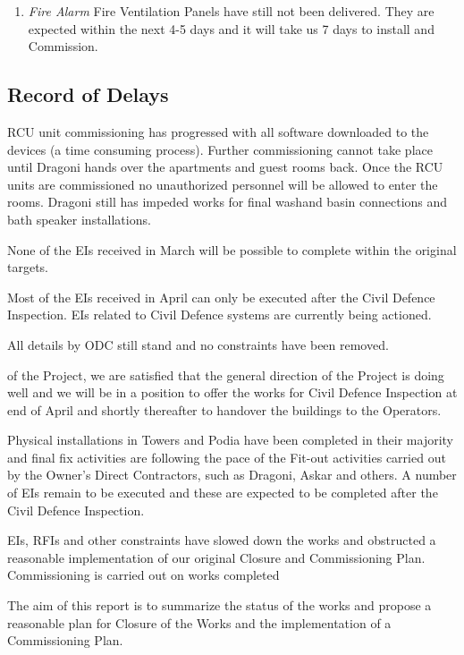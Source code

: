 \begin{update}
\begin{enumerate}
\item \textit{Fire Alarm} Fire Ventilation Panels have still not been delivered. They are expected within
the next 4-5 days and it will take us 7 days to install and Commission.
\end{enumerate}



\subsection*{Record of Delays}
RCU unit commissioning has progressed with all software downloaded to the devices (a time consuming process). Further commissioning cannot take place until Dragoni hands over the apartments and guest rooms back. Once the RCU units are commissioned no unauthorized personnel will be allowed to enter the rooms. Dragoni still has impeded works for final washand basin connections and bath speaker installations.

None of the EIs received in March will be possible to complete within the original targets. 

Most of the EIs received in April can only be executed after the Civil Defence Inspection. EIs related to Civil Defence systems are currently being actioned.

All details by ODC still stand and no constraints have been removed.
\end{update}

 of the Project, we are satisfied that the general direction of the Project is doing well and we will be in a position to offer the works for Civil Defence Inspection at end of April and shortly thereafter to  handover the buildings to the Operators. 

Physical installations in Towers and Podia have been completed in their majority and final fix activities are following the pace of the Fit-out activities carried out by the Owner's Direct Contractors, such as Dragoni, Askar and others.  A number of EIs remain to be executed and these are expected to be completed after the Civil Defence Inspection.

EIs, RFIs and other constraints have slowed down the works and obstructed a reasonable implementation of our original Closure and Commissioning Plan. Commissioning is carried out on works completed

The aim of this report is to summarize the status of the works
and propose a reasonable plan for Closure of the Works and the implementation of a Commissioning Plan.

